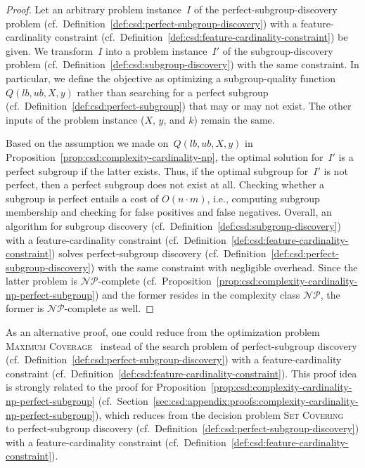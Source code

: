 \documentclass{article}
\theoremstyle{definition}
\begin{document}
\begin{proof}
Let an arbitrary problem instance~$I$ of the perfect-subgroup-discovery problem (cf.~Definition~\ref{def:csd:perfect-subgroup-discovery}) with a feature-cardinality constraint (cf.~Definition~\ref{def:csd:feature-cardinality-constraint}) be given.
We transform~$I$ into a problem instance~$I'$ of the subgroup-discovery problem (cf.~Definition~\ref{def:csd:subgroup-discovery}) with the same constraint.
In particular, we define the objective as optimizing a subgroup-quality function~$Q(\mathit{lb}, \mathit{ub}, X, y)$ rather than searching for a perfect subgroup (cf.~Definition~\ref{def:csd:perfect-subgroup}) that may or may not exist.
The other inputs of the problem instance ($X$, $y$, and $k$) remain the same.

Based on the assumption we made on~$Q(\mathit{lb}, \mathit{ub}, X, y)$ in Proposition~\ref{prop:csd:complexity-cardinality-np}, the optimal solution for~$I'$ is a perfect subgroup if the latter exists.
Thus, if the optimal subgroup for~$I'$ is not perfect, then a perfect subgroup does not exist at all.
Checking whether a subgroup is perfect entails a cost of $O(n \cdot m)$, i.e., computing subgroup membership and checking for false positives and false negatives.
Overall, an algorithm for subgroup discovery (cf.~Definition~\ref{def:csd:subgroup-discovery}) with a feature-cardinality constraint (cf.~Definition~\ref{def:csd:feature-cardinality-constraint}) solves perfect-subgroup discovery (cf.~Definition~\ref{def:csd:perfect-subgroup-discovery}) with the same constraint with negligible overhead.
Since the latter problem is $\mathcal{NP}$-complete (cf.~Proposition~\ref{prop:csd:complexity-cardinality-np-perfect-subgroup}) and the former resides in the complexity class $\mathcal{NP}$, the former is $\mathcal{NP}$-complete as well.
\end{proof}
%
As an alternative proof, one could reduce from the optimization problem \textsc{Maximum Coverage}~\cite{chekuri2004maximum} instead of the search problem of perfect-subgroup discovery (cf.~Definition~\ref{def:csd:perfect-subgroup-discovery}) with a feature-cardinality constraint (cf.~Definition~\ref{def:csd:feature-cardinality-constraint}).
This proof idea is strongly related to the proof for Proposition~\ref{prop:csd:complexity-cardinality-np-perfect-subgroup} (cf.~Section~\ref{sec:csd:appendix:proofs:complexity-cardinality-np-perfect-subgroup}), which reduces from the decision problem \textsc{Set Covering}~\cite{karp1972reducibility} to perfect-subgroup discovery (cf.~Definition~\ref{def:csd:perfect-subgroup-discovery}) with a feature-cardinality constraint (cf.~Definition~\ref{def:csd:feature-cardinality-constraint}).
\end{document}
